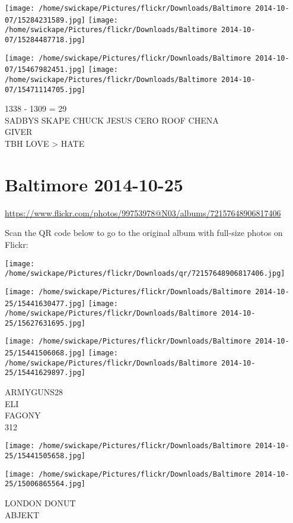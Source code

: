 \documentclass[10pt,letterpaper]{article}
\begin{document}
\texttt{[image: /home/swickape/Pictures/flickr/Downloads/Baltimore 2014-10-07/15284231589.jpg]}
\texttt{[image: /home/swickape/Pictures/flickr/Downloads/Baltimore 2014-10-07/15284487718.jpg]}

\texttt{[image: /home/swickape/Pictures/flickr/Downloads/Baltimore 2014-10-07/15467982451.jpg]}
\texttt{[image: /home/swickape/Pictures/flickr/Downloads/Baltimore 2014-10-07/15471114705.jpg]}

1338 {-} 1309 = 29\\
SADBYS SKAPE CHUCK JESUS CERO ROOF CHENA\\
GIVER\\
TBH LOVE > HATE
\pagebreak

\section*{Baltimore 2014-10-25}

\url{https://www.flickr.com/photos/99753978@N03/albums/72157648906817406}

Scan the QR code below to go to the original album with full-size photos on Flickr:

\texttt{[image: /home/swickape/Pictures/flickr/Downloads/qr/72157648906817406.jpg]}
\pagebreak

\texttt{[image: /home/swickape/Pictures/flickr/Downloads/Baltimore 2014-10-25/15441630477.jpg]}
\texttt{[image: /home/swickape/Pictures/flickr/Downloads/Baltimore 2014-10-25/15627631695.jpg]}

\texttt{[image: /home/swickape/Pictures/flickr/Downloads/Baltimore 2014-10-25/15441506068.jpg]}
\texttt{[image: /home/swickape/Pictures/flickr/Downloads/Baltimore 2014-10-25/15441629897.jpg]}

ARMYGUNS28\\
ELI\\
FAGONY\\
312
\pagebreak

\texttt{[image: /home/swickape/Pictures/flickr/Downloads/Baltimore 2014-10-25/15441505658.jpg]}

\vspace{0.25in}
\texttt{[image: /home/swickape/Pictures/flickr/Downloads/Baltimore 2014-10-25/15006865564.jpg]}

LONDON DONUT\\
ABJEKT
\pagebreak
\end{document}
